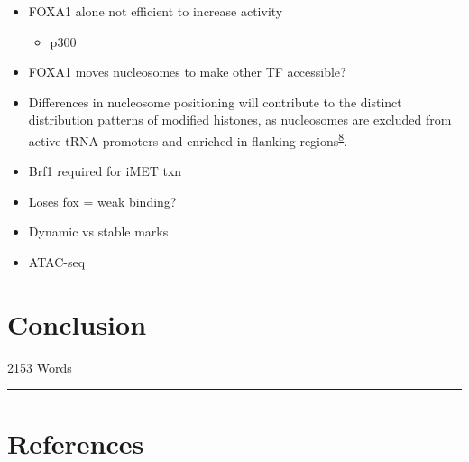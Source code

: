 \documentclass[
  11pt,
]{article}
\providecommand{\tightlist}{%
  \setlength{\itemsep}{0pt}\setlength{\parskip}{0pt}}
\begin{document}
\begin{itemize}
\item
  FOXA1 alone not efficient to increase activity

  \begin{itemize}
  \tightlist
  \item
    p300
  \end{itemize}
\item
  FOXA1 moves nucleosomes to make other TF accessible?
\item
  Differences in nucleosome positioning will contribute to the distinct distribution patterns of modified histones, as nucleosomes are excluded from active tRNA promoters and enriched in flanking regions\textsuperscript{\href{https://www.nature.com/articles/nrg3001\#ref-CR8}{8}}.
\item
  Brf1 required for iMET txn
\item
  Loses fox = weak binding?
\item
  Dynamic vs stable marks
\item
  ATAC-seq
\end{itemize}

\hypertarget{conclusion}{%
\section{Conclusion}\label{conclusion}}

\begin{flushright}
2153 Words
\end{flushright}
\footnotesize

\begin{center}\rule{0.5\linewidth}{0.5pt}\end{center}

\hypertarget{references}{%
\section*{References}\label{references}}
\end{document}
